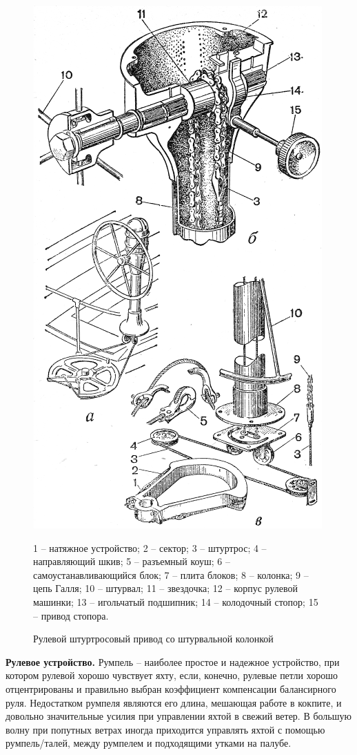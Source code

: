 \documentclass[a4paper, 12pt, twoside, final, book, russian, fittopage, cyremdash]{ncc}
\begin{document}
\begin{figure}
  \centering
  \includegraphics[scale=1.2]{0035P}
  \caption{Рулевой штуртросовый привод со штурвальной колонкой}
  \label{fig:35}
  \small
  \centering{}
  1 \--- натяжное устройство; 2 \--- сектор; 3 \--- штуртрос; 4 \--- направляющий шкив; 5 \--- разъемный коуш; 6 \--- самоустанавливающийся блок; 7 \--- плита блоков; 8 \--- колонка; 9 \--- цепь Галля; 10 \--- штурвал; 11 \--- звездочка; 12 \--- корпус рулевой машинки; 13 \--- игольчатый подшипник; 14 \--- колодочный стопор; 15 \--- привод стопора.
\smallskip
\end{figure}

\textbf{Рулевое устройство.} Румпель \--- наиболее простое и надежное устройство, при котором рулевой хорошо чувствует яхту, если, конечно, рулевые петли хорошо отцентрированы и правильно выбран коэффициент компенсации балансирного руля. Недостатком румпеля являются его длина, мешающая работе в кокпите, и довольно значительные усилия при управлении яхтой в свежий ветер. В большую волну при попутных ветрах иногда приходится управлять яхтой с помощью румпель\-/талей, между румпелем и подходящими утками на палубе. 
\end{document}
